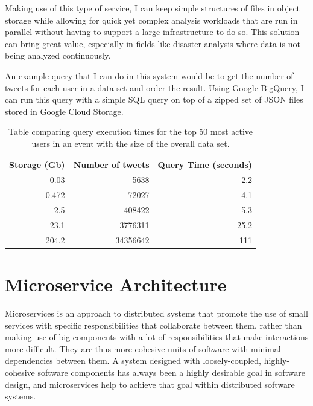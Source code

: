 Making use of this type of service, I can keep simple structures of files in object storage while allowing for quick yet complex analysis workloads that are run in parallel without having to support a large infrastructure to do so. This solution can bring great value, especially in fields like disaster analysis where data is not being analyzed continuously. 

An example query that I can do in this system would be to get the number of tweets for each user in a data set and order the result. Using Google BigQuery, I can run this query with a simple SQL query on top of a zipped set of JSON files stored in Google Cloud Storage. 

\begin{table}[htb]
    \caption[Table comparing execution times to data set size]{
    Table comparing query execution times for the top 50 most active users in an event with the size of the overall data set.
	}
    \begin{center}
    \begin{tabular}{|r|r|r|} \hline
	 \textbf{Storage (Gb)} & \textbf{Number of tweets} & \textbf{Query Time (seconds)} \\ \hline 
	
0.03 & 5638 & 2.2 \\ \hline
0.472 & 72027 & 4.1 \\ \hline
2.5 & 408422 & 5.3 \\ \hline
23.1 & 3776311 & 25.2 \\ \hline
204.2 & 34356642 & 111 \\ \hline

	\end{tabular}
   
\end{center}
\label{powertable}
\end{table}


\section{Microservice Architecture}

Microservices is an approach to distributed systems that promote the use of small services with specific responsibilities that collaborate between them, rather than making use of big components with a lot of responsibilities that make interactions more difficult. They are thus more cohesive units of software with minimal dependencies between them. A system designed with loosely-coupled, highly-cohesive software components has always been a highly desirable goal in software design, and microservices help to achieve that goal within distributed software systems\cite{gradybook}.


